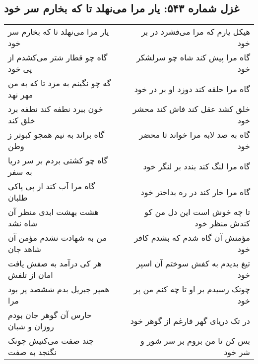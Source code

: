 \begin{center}
\section*{غزل شماره ۵۴۳: یار مرا می‌نهلد تا که بخارم سر خود}
\label{sec:0543}
\begin{longtable}{l p{0.5cm} r}
یار مرا می‌نهلد تا که بخارم سر خود
&&
هیکل یارم که مرا می‌فشرد در بر خود
\\
گاه چو قطار شتر می‌کشدم از پی خود
&&
گاه مرا پیش کند شاه چو سرلشکر خود
\\
گه چو نگینم به مزد تا که به من مهر نهد
&&
گاه مرا حلقه کند دوزد او بر در خود
\\
خون ببرد نطفه کند نطفه برد خلق کند
&&
خلق کشد عقل کند فاش کند محشر خود
\\
گاه براند به نیم همچو کبوتر ز وطن
&&
گاه به صد لابه مرا خواند تا محضر خود
\\
گاه چو کشتی بردم بر سر دریا به سفر
&&
گاه مرا لنگ کند بندد بر لنگر خود
\\
گاه مرا آب کند از پی پاکی طلبان
&&
گاه مرا خار کند در ره بداختر خود
\\
هشت بهشت ابدی منظر آن شاه نشد
&&
تا چه خوش است این دل من کو کندش منظر خود
\\
من به شهادت نشدم مؤمن آن شاهد جان
&&
مؤمنش آن گاه شدم که بشدم کافر خود
\\
هر کی درآمد به صفش یافت امان از تلفش
&&
تیغ بدیدم به کفش سوختم آن اسپر خود
\\
همپر جبریل بدم ششصد پر بود مرا
&&
چونک رسیدم بر او تا چه کنم من پر خود
\\
حارس آن گوهر جان بودم روزان و شبان
&&
در تک دریای گهر فارغم از گوهر خود
\\
چند صفت می‌کنیش چونک نگنجد به صفت
&&
بس کن تا من بروم بر سر شور و شر خود
\\
\end{longtable}
\end{center}
